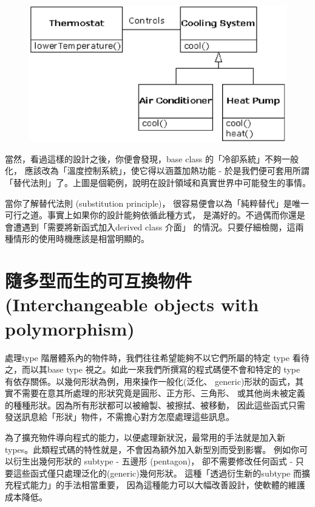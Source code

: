 \begin{figure}[htbp]
\centering
\includegraphics[scale=0.8]{eps/TIJ209.eps}
\end{figure}


當然，看過這樣的設計之後，你便會發現，base class 的「冷卻系統」不夠一般化，
應該改為「溫度控制系統」，使它得以涵蓋加熱功能 - 於是我們便可套用所謂
「替代法則」了。上圖是個範例，說明在設計領域和真實世界中可能發生的事情。

當你了解替代法則 (substitution principle)，
很容易便會以為「純粹替代」是唯一可行之道。事實上如果你的設計能夠依循此種方式，
是滿好的。不過偶而你還是會遭遇到「需要將新函式加入derived class 介面」
的情況。只要仔細檢閱，這兩種情形的使用時機應該是相當明顯的。

\section[隨多型而生的可互換物件]{隨多型而生的可互換物件 \\(Interchangeable objects with polymorphism)}
處理type 階層體系內的物件時，我們往往希望能夠不以它們所屬的特定
type 看待之，而以其base type 視之。如此一來我們所撰寫的程式碼便不會和特定的
type 有依存關係。以幾何形狀為例，用來操作一般化(泛化、
generic)形狀的函式，其實不需要在意其所處理的形狀究竟是圓形、正方形、三角形、
或其他尚未被定義的種種形狀。因為所有形狀都可以被繪製、被擦拭、被移動，
因此這些函式只需發送訊息給「形狀」物件，不需擔心對方怎麼處理這些訊息。

為了擴充物件導向程式的能力，以便處理新狀況，最常用的手法就是加入新
types。此類程式碼的特性就是，不會因為額外加入新型別而受到影響。
例如你可以衍生出幾何形狀的 subtype - 五邊形 (pentagon)，
卻不需要修改任何函式 - 只要這些函式僅只處理泛化的(generic)幾何形狀。
這種「透過衍生新的subtype 而擴充程式能力」的手法相當重要，
因為這種能力可以大幅改善設計，使軟體的維護成本降低。

